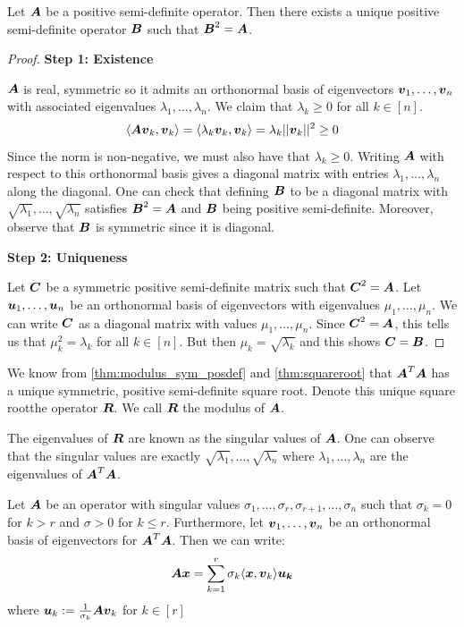 \begin{theorem}\label{thm:squareroot}
    Let $\boldsymbol{A}$ be a positive semi-definite operator. Then there exists a unique positive semi-definite operator $\boldsymbol{B}$ such that $\boldsymbol{B}^2=\boldsymbol{A}$.
\end{theorem}

\begin{proof}
    \textbf{Step 1: Existence}

    $\boldsymbol{A}$ is real, symmetric so it admits an orthonormal basis of eigenvectors $\boldsymbol{v}_1,\dots,\boldsymbol{v}_n$ with associated eigenvalues $\lambda_1,\dots,\lambda_n$. We claim that $\lambda_k\geq 0$ for all $k\in[n]$.
    \[\langle\boldsymbol{A}\boldsymbol{v}_k,\boldsymbol{v}_k\rangle=\langle\lambda_k\boldsymbol{v}_k,\boldsymbol{v}_k\rangle=\lambda_k||\boldsymbol{v}_k||^2\geq 0\]
    Since the norm is non-negative, we must also have that $\lambda_k\geq 0$. Writing $\boldsymbol{A}$ with respect to this orthonormal basis gives a diagonal matrix with entries $\lambda_1,\dots,\lambda_n$ along the diagonal. One can check that defining $\boldsymbol{B}$ to be a diagonal matrix with $\sqrt{\lambda_1},\dots,\sqrt{\lambda_n}$ satisfies $\boldsymbol{B}^2=\boldsymbol{A}$ and $\boldsymbol{B}$ being positive semi-definite. Moreover, observe that $\boldsymbol{B}$ is symmetric since it is diagonal.

    \textbf{Step 2: Uniqueness}

    Let $\boldsymbol{C}$ be a symmetric positive semi-definite matrix such that $\boldsymbol{C}^2=\boldsymbol{A}$. Let $\boldsymbol{u}_1,\dots,\boldsymbol{u}_n$ be an orthonormal basis of eigenvectors with eigenvalues $\mu_1,\dots,\mu_n$. We can write $\boldsymbol{C}$ as a diagonal matrix with values $\mu_1,\dots,\mu_n$. Since $\boldsymbol{C}^2=\boldsymbol{A}$, this tells us that $\mu_k^2=\lambda_k$ for all $k\in[n]$. But then $\mu_k=\sqrt{\lambda_k}$ and this shows $\boldsymbol{C}=\boldsymbol{B}$.
\end{proof}

We know from \ref{thm:modulus_sym_posdef} and \ref{thm:squareroot} that $\boldsymbol{A}^T\boldsymbol{A}$ has a unique symmetric, positive semi-definite square root. Denote this unique square rootthe operator $\boldsymbol{R}$. We call $\boldsymbol{R}$ the modulus of $\boldsymbol{A}$.

The eigenvalues of $\boldsymbol{R}$ are known as the singular values of $\boldsymbol{A}$. One can observe that the singular values are exactly $\sqrt{\lambda_1},\dots,\sqrt{\lambda_n}$ where $\lambda_1,\dots,\lambda_n$ are the eigenvalues of $\boldsymbol{A}^T\boldsymbol{A}$.

\begin{theorem}\label{thm:schmidtdecomp}
    Let $\boldsymbol{A}$ be an operator with singular values $\sigma_1,\dots,\sigma_r,\sigma_{r+1},\dots,\sigma_n$ such that $\sigma_k=0$ for $k>r$ and $\sigma>0$ for $k\leq r$. Furthermore, let $\boldsymbol{v}_1,\dots,\boldsymbol{v}_n$ be an orthonormal basis of eigenvectors for $\boldsymbol{A}^T\boldsymbol{A}$. Then we can write:
    \[
    \boldsymbol{A}\boldsymbol{x}=\sum_{k=1}^r\sigma_k\langle\boldsymbol{x},\boldsymbol{v}_k\rangle\boldsymbol{u_k}
    \]
    where $\boldsymbol{u}_k:=\frac{1}{\sigma_k}\boldsymbol{A}\boldsymbol{v}_k$ for $k\in[r]$
\end{theorem}

